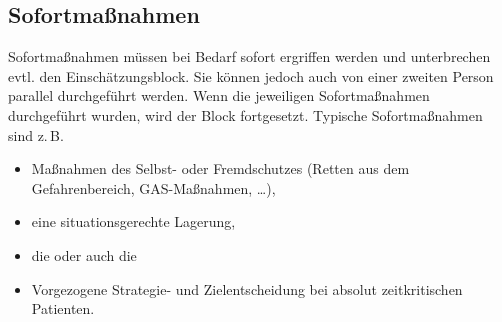 


\subsection{Sofortmaßnahmen}
\label{topic:patientenmanagement-erstmassnahmen}
\label{topic:patientenmanagement-sofortmassnahmen}


Sofortmaßnahmen müssen bei Bedarf sofort ergriffen
werden und unterbrechen evtl. den Einschätzungsblock. Sie
können jedoch auch von einer zweiten Person parallel
durchgeführt werden. Wenn die jeweiligen Sofortmaßnahmen durchgeführt
wurden, wird der Block fortgesetzt. Typische Sofortmaßnahmen
sind z.\,B. 
\begin{itemize}
  \item Maßnahmen des Selbst- oder Fremdschutzes (Retten
  aus dem Gefahrenbereich, GAS-Maßnahmen, \ldots),
  \item eine situationsgerechte Lagerung,
  \item die \EE{\TxMassVit} oder auch die
  \item Vorgezogene Strategie- und Zielentscheidung bei absolut zeitkritischen Patienten.
\end{itemize}





